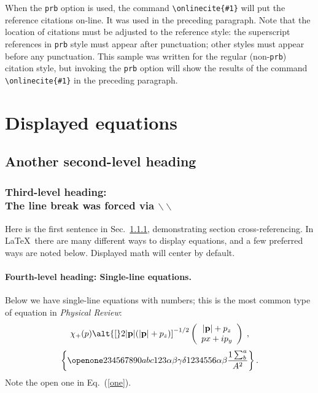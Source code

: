 When the {\tt prb} option is used, the command \verb+\onlinecite{#1}+ will
put the reference citations on-line. It was used in the preceding paragraph.
Note that the location of citations must be adjusted to the reference style:
the superscript references in {\tt prb} style must appear after punctuation;
other styles must appear before any punctuation. This sample was written
for the regular (non-{\tt prb}) citation style, but invoking the
{\tt prb} option will show the results of  the command \verb+\onlinecite{#1}+
in the preceding paragraph.



\section{Displayed equations}
\subsection{Another second-level heading}
\subsubsection{Third-level heading:\protect\\ The line break was forced via
$\backslash\backslash$}
\label{sec:level3}

Here is the first sentence in Sec.\ \ref{sec:level3}, demonstrating
section cross-referencing.
In \LaTeX\ there are many different ways to display equations, and a
few preferred ways are noted below.
Displayed math will center by default.

\paragraph{Fourth-level heading: Single-line equations.}
Below we have single-line equations with numbers; this is
the most common type of equation in {\it Physical Review\/}:
\begin{equation}
\chi_+(p)\alt{\bf [}2|{\bf p}|(|{\bf p}|+p_z){\bf ]}^{-1/2}
\left(
\begin{array}{c}
|{\bf p}|+p_z\\
px+ip_y
\end{array}\right)\;,
\end{equation}
\begin{equation}
\left\{\openone234567890abc123\alpha\beta\gamma\delta%
1234556\alpha\beta{1\sum^{a}_{b}\over A^2}\right\}\label{one}.
\end{equation}
Note the open one in Eq.\ (\ref{one}).

